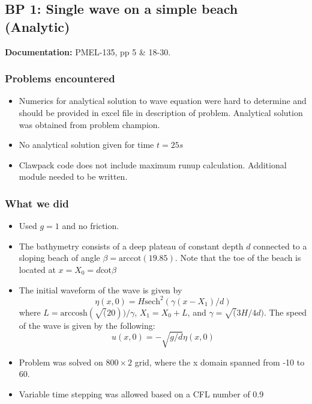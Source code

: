 \newsection
\subsection{BP 1:
  Single wave on a simple beach (Analytic)}

{\bf Documentation:}  PMEL-135, pp 5 \&
18-30.\cite{SynolakisBernard:pmel135}

\subsubsection{Problems encountered}

\begin{itemize}
\item Numerics for analytical solution to wave equation were hard to determine and should be provided in excel file in description of problem. Analytical solution was obtained from problem champion.
\item No analytical solution given for time $t = 25s$
\item Clawpack code does not include maximum runup calculation. Additional module needed to be written. 
\end{itemize}

\subsubsection{What we did}

\begin{itemize}
\item Used $g=1$ and no friction.
\item The bathymetry consists of a deep plateau of constant depth $d$
connected to a sloping beach of angle $\beta = \text{arccot}(19.85)$. 
Note that the toe of the beach is located at $x = X_0 = d \text{cot} \beta$
\item The initial waveform of the wave is given by 
\begin{equation}
\eta(x,0) = H \text{sech}^2(\gamma (x - X_1)/d)
\end{equation}
where $L = \text{arccosh}(\sqrt(20))/\gamma$, $X_1 = X_0 + L$, 
and $\gamma = \sqrt(3H/4d)$. The speed of the wave is given by the following: 
\begin{equation}
u(x,0)=-\sqrt{g/d}\eta(x,0)
\end{equation}
\item Problem was solved on $800\times 2$ grid, where the x domain spanned from -10 to 60.
\item Variable time stepping was allowed based on a CFL number of 0.9
\end{itemize} 

